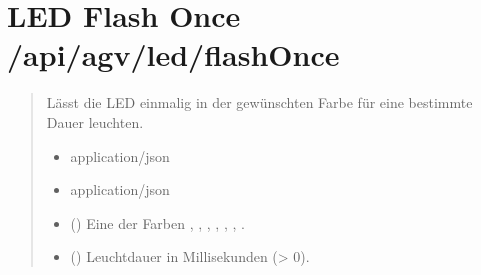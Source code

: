 \documentclass[letterpaper,10pt,english]{sphinxmanual}
\begin{document}
\section{LED Flash Once \textendash{} /api/agv/led/flashOnce}
\label{\detokenize{agv_rest_api_led:led-flash-once-api-agv-led-flashonce}}\label{\detokenize{agv_rest_api_led:post-api-agv-led-flashonce}}

\begin{fulllineitems}
\label{\detokenize{agv_rest_api_led:post--api-agv-led-flashOnce}}
\pysigstartsignatures
\pysigline
{}
\pysigstopsignatures\begin{quote}\begin{description}
\sphinxAtStartPar
Lässt die LED einmalig in der gewünschten Farbe für eine bestimmte Dauer leuchten.

\begin{itemize}
\item {} 
\sphinxAtStartPar
{} \textendash{} application/json

\end{itemize}

\begin{itemize}
\item {} 
\sphinxAtStartPar
{} \textendash{} application/json

\end{itemize}

\begin{itemize}
\item {} 
\sphinxAtStartPar
{} () \textendash{} Eine der Farben , , , , , , .

\item {} 
\sphinxAtStartPar
{} () \textendash{} Leuchtdauer in Millisekunden (\textgreater{} 0).


\end{itemize}
\end{description}
\end{quote}
\end{fulllineitems}
\end{document}
